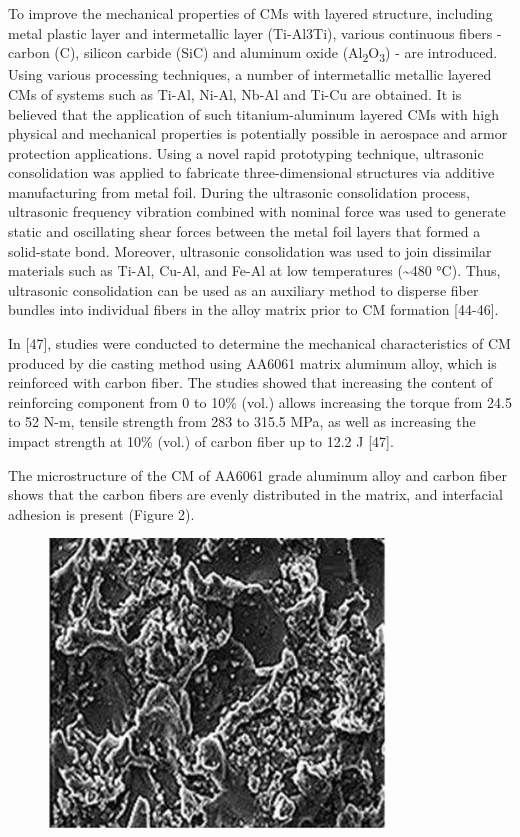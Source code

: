 To improve the mechanical properties of CMs with layered structure,
including metal plastic layer and intermetallic layer (Ti-Al3Ti),
various continuous fibers - carbon (C), silicon carbide (SiC) and
aluminum oxide (Al\textsubscript{2}O\textsubscript{3}) - are introduced.
Using various processing techniques, a number of intermetallic metallic
layered CMs of systems such as Ti-Al, Ni-Al, Nb-Al and Ti-Cu are
obtained. It is believed that the application of such titanium-aluminum
layered CMs with high physical and mechanical properties is potentially
possible in aerospace and armor protection applications. Using a novel
rapid prototyping technique, ultrasonic consolidation was applied to
fabricate three-dimensional structures via additive manufacturing from
metal foil. During the ultrasonic consolidation process, ultrasonic
frequency vibration combined with nominal force was used to generate
static and oscillating shear forces between the metal foil layers that
formed a solid-state bond. Moreover, ultrasonic consolidation was used
to join dissimilar materials such as Ti-Al, Cu-Al, and Fe-Al at low
temperatures (\textasciitilde480 °C). Thus, ultrasonic consolidation can
be used as an auxiliary method to disperse fiber bundles into individual
fibers in the alloy matrix prior to CM formation {[}44-46{]}.

In {[}47{]}, studies were conducted to determine the mechanical
characteristics of CM produced by die casting method using AA6061 matrix
aluminum alloy, which is reinforced with carbon fiber. The studies
showed that increasing the content of reinforcing component from 0 to
10\% (vol.) allows increasing the torque from 24.5 to 52 N-m, tensile
strength from 283 to 315.5 MPa, as well as increasing the impact
strength at 10\% (vol.) of carbon fiber up to 12.2 J {[}47{]}.

The microstructure of the CM of AA6061 grade aluminum alloy and carbon
fiber shows that the carbon fibers are evenly distributed in the matrix,
and interfacial adhesion is present (Figure 2).


\begin{figure}[H]
	\centering
	\includegraphics[width=0.8\textwidth]{media/chem2/image8}
	\caption*{}
\end{figure}


